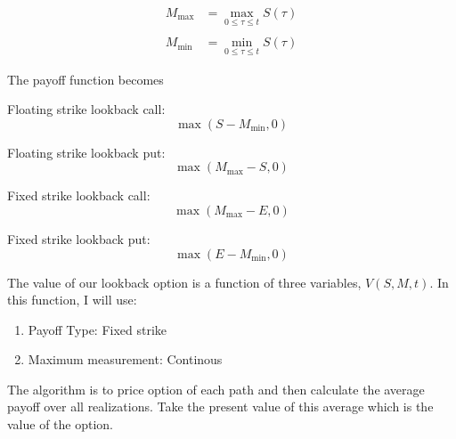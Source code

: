 \documentclass[11pt]{article}
\begin{document}
\[
\begin{align*}
M_{\max} &= \max_{0 \leq \tau \leq t} S(\tau)
\\\\
M_{\min} &= \min_{0 \leq \tau \leq t} S(\tau)
\end{align*}
\]

    The payoff function becomes

Floating strike lookback call: \[
\max(S - M_{\min},0)
\]

Floating strike lookback put: \[
\max( M_{\max} - S,0)
\]

Fixed strike lookback call: \[
\max(M_{\max} - E,0)
\]

Fixed strike lookback put: \[
\max(E - M_{\min},0)
\]

    The value of our lookback option is a function of three variables,
\(V (S, M, t)\). In this function, I will use:

\begin{enumerate}
\def\labelenumi{\arabic{enumi}.}
\item
  Payoff Type: Fixed strike
\item
  Maximum measurement: Continous
\end{enumerate}

The algorithm is to price option of each path and then calculate the
average payoff over all realizations. Take the present value of this
average which is the value of the option.
\end{document}
